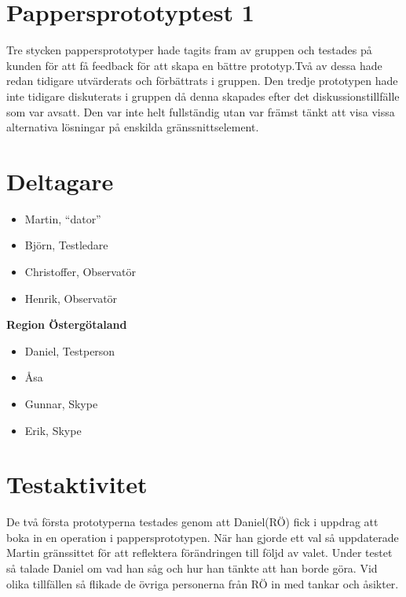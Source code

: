 \documentclass[a4paper,10pt]{article}
\begin{document}
\section{Pappersprototyptest 1}
Tre stycken pappersprototyper hade tagits fram av gruppen och testades på kunden för att få feedback för att skapa en bättre prototyp.Två av dessa hade redan tidigare utvärderats och förbättrats i gruppen. Den tredje prototypen hade inte tidigare diskuterats i gruppen då denna skapades efter det diskussionstillfälle som var avsatt. Den var inte helt fullständig utan var främst tänkt att visa vissa alternativa lösningar på enskilda gränssnittselement.
\section{Deltagare}
\begin{itemize}
\item Martin, “dator”
\item Björn, Testledare
\item Christoffer, Observatör
\item Henrik, Observatör
\end{itemize}

\textbf{Region Östergötaland}
\begin{itemize}
\item Daniel, Testperson
\item Åsa
\item Gunnar, Skype
\item Erik, Skype
\end{itemize}
\section{Testaktivitet}
De två första prototyperna testades genom att Daniel(RÖ) fick i uppdrag att boka in en operation i pappersprototypen. När han gjorde ett val så uppdaterade Martin gränssittet för att reflektera förändringen till följd av valet. Under testet så talade Daniel om vad han såg och hur han tänkte att han borde göra. Vid olika tillfällen så flikade de övriga personerna från RÖ in med tankar och åsikter.
\end{document}
